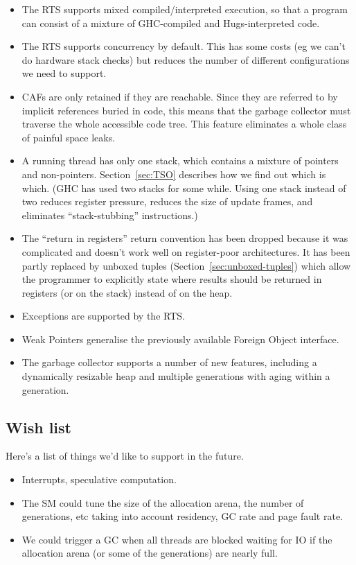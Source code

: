 \documentclass[11pt]{article}
\newcommand{\secref}[1]{Section~\ref{sec:#1}}
\newcommand{\Subsection}[2]{\subsection{#1}\label{sec:#2}}
\begin{document}
\begin{itemize}
\item The RTS supports mixed compiled/interpreted execution, so
that a program can consist of a mixture of GHC-compiled and Hugs-interpreted
code.

\item The RTS supports concurrency by default.
This has some costs (eg we can't do hardware stack checks) but
reduces the number of different configurations we need to support.

\item CAFs are only retained if they are
reachable.  Since they are referred to by implicit references buried
in code, this means that the garbage collector must traverse the whole
accessible code tree.  This feature eliminates a whole class of painful
space leaks.

\item A running thread has only one stack, which contains a mixture of
pointers and non-pointers.  \secref{TSO} describes how we find out
which is which.  (GHC has used two stacks for some while.  Using one
stack instead of two reduces register pressure, reduces the size of
update frames, and eliminates ``stack-stubbing'' instructions.)

\item The ``return in registers'' return convention has been dropped
because it was complicated and doesn't work well on register-poor
architectures.  It has been partly replaced by unboxed tuples
(\secref{unboxed-tuples}) which allow the programmer to
explicitly state where results should be returned in registers (or on
the stack) instead of on the heap.

\item Exceptions are supported by the RTS.

\item Weak Pointers generalise the previously available Foreign Object
interface.

\item The garbage collector supports a number of new features,
including a dynamically resizable heap and multiple generations with
aging within a generation.

\end{itemize}

\Subsection{Wish list}{wish-list}

Here's a list of things we'd like to support in the future.
\begin{itemize}
\item Interrupts, speculative computation.

\item
The SM could tune the size of the allocation arena, the number of
generations, etc taking into account residency, GC rate and page fault
rate.

\item 
We could trigger a GC when all threads are blocked waiting for IO if
the allocation arena (or some of the generations) are nearly full.

\end{itemize}
\end{document}
